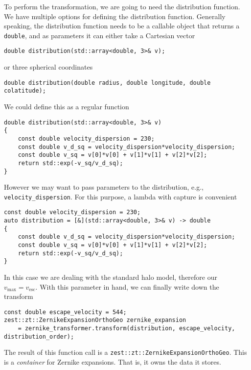 \documentclass{article}
\begin{document}
To perform the transformation, we are going to need the distribution function. We have multiple options for defining the distribution function. Generally speaking, the distribution function needs to be a callable object that returns a \texttt{double}, and as parameters it can either take a Cartesian vector
\begin{verbatim}
double distribution(std::array<double, 3>& v);
\end{verbatim}
or three spherical coordinates
\begin{verbatim}
double distribution(double radius, double longitude, double colatitude);
\end{verbatim}
We could define this as a regular function
\begin{verbatim}
double distribution(std::array<double, 3>& v)
{
    const double velocity_dispersion = 230;
    const double v_d_sq = velocity_dispersion*velocity_dispersion;
    const double v_sq = v[0]*v[0] + v[1]*v[1] + v[2]*v[2];
    return std::exp(-v_sq/v_d_sq);
}
\end{verbatim}
However we may want to pass parameters to the distribution, e.g., \texttt{velocity_dispersion}. For this purpose, a lambda with capture is convenient
\begin{verbatim}
const double velocity_dispersion = 230;
auto distribution = [&](std::array<double, 3>& v) -> double
{
    const double v_d_sq = velocity_dispersion*velocity_dispersion;
    const double v_sq = v[0]*v[0] + v[1]*v[1] + v[2]*v[2];
    return std::exp(-v_sq/v_d_sq);
}
\end{verbatim}

In this case we are dealing with the standard halo model, therefore our $v_\text{max}=v_\text{esc}$. With this parameter in hand, we can finally write down the transform
\begin{verbatim}
const double escape_velocity = 544;
zest::zt::ZernikeExpansionOrthoGeo zernike_expansion
    = zernike_transformer.transform(distribution, escape_velocity, distribution_order);
\end{verbatim}
The result of this function call is a \texttt{zest::zt::ZernikeExpansionOrthoGeo}. This is a \emph{container} for Zernike expansions. That is, it owns the data it stores.
\end{document}
